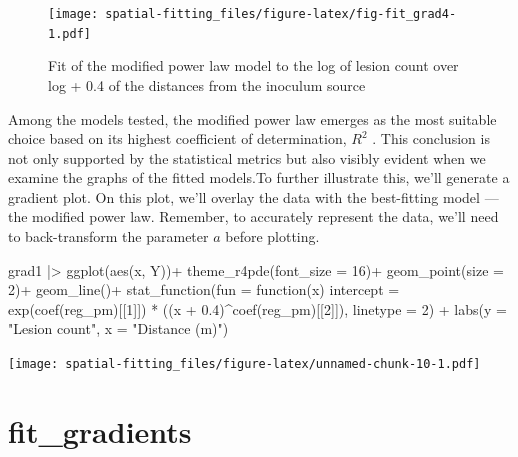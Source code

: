 \documentclass[
  letterpaper,
]{book}
\newenvironment{Shaded}{\begin{snugshade}}{\end{snugshade}}
\newcommand{\AttributeTok}[1]{\textcolor[rgb]{0.40,0.45,0.13}{#1}}
\newcommand{\ControlFlowTok}[1]{\textcolor[rgb]{0.00,0.23,0.31}{#1}}
\newcommand{\DecValTok}[1]{\textcolor[rgb]{0.68,0.00,0.00}{#1}}
\newcommand{\FloatTok}[1]{\textcolor[rgb]{0.68,0.00,0.00}{#1}}
\newcommand{\FunctionTok}[1]{\textcolor[rgb]{0.28,0.35,0.67}{#1}}
\newcommand{\NormalTok}[1]{\textcolor[rgb]{0.00,0.23,0.31}{#1}}
\newcommand{\SpecialCharTok}[1]{\textcolor[rgb]{0.37,0.37,0.37}{#1}}
\newcommand{\StringTok}[1]{\textcolor[rgb]{0.13,0.47,0.30}{#1}}
\begin{document}
\begin{figure}

{\centering \texttt{[image: spatial-fitting\_files/figure-latex/fig-fit\_grad4-1.pdf]}

}

\caption{\label{fig-fit_grad4}Fit of the modified power law model to the
log of lesion count over log + 0.4 of the distances from the inoculum
source}

\end{figure}

Among the models tested, the modified power law emerges as the most
suitable choice based on its highest coefficient of determination,
\(R^2\) . This conclusion is not only supported by the statistical
metrics but also visibly evident when we examine the graphs of the
fitted models.To further illustrate this, we'll generate a gradient
plot. On this plot, we'll overlay the data with the best-fitting model
--- the modified power law. Remember, to accurately represent the data,
we'll need to back-transform the parameter \(a\) before plotting.

\begin{Shaded}
\begin{Highlighting}[]
\NormalTok{grad1 }\SpecialCharTok{|\textgreater{}} 
  \FunctionTok{ggplot}\NormalTok{(}\FunctionTok{aes}\NormalTok{(x, Y))}\SpecialCharTok{+}
  \FunctionTok{theme\_r4pde}\NormalTok{(}\AttributeTok{font\_size =} \DecValTok{16}\NormalTok{)}\SpecialCharTok{+}
  \FunctionTok{geom\_point}\NormalTok{(}\AttributeTok{size =} \DecValTok{2}\NormalTok{)}\SpecialCharTok{+}
  \FunctionTok{geom\_line}\NormalTok{()}\SpecialCharTok{+}
  \FunctionTok{stat\_function}\NormalTok{(}\AttributeTok{fun =} \ControlFlowTok{function}\NormalTok{(x) }\AttributeTok{intercept =} \FunctionTok{exp}\NormalTok{(}\FunctionTok{coef}\NormalTok{(reg\_pm)[[}\DecValTok{1}\NormalTok{]]) }\SpecialCharTok{*}\NormalTok{ ((x }\SpecialCharTok{+} \FloatTok{0.4}\NormalTok{)}\SpecialCharTok{\^{}}\FunctionTok{coef}\NormalTok{(reg\_pm)[[}\DecValTok{2}\NormalTok{]]), }\AttributeTok{linetype =} \DecValTok{2}\NormalTok{) }\SpecialCharTok{+}
  \FunctionTok{labs}\NormalTok{(}\AttributeTok{y =} \StringTok{"Lesion count"}\NormalTok{,}
       \AttributeTok{x =} \StringTok{"Distance (m)"}\NormalTok{)}
\end{Highlighting}
\end{Shaded}

\texttt{[image: spatial-fitting\_files/figure-latex/unnamed-chunk-10-1.pdf]}

\hypertarget{fit_gradients}{%
\section{fit\_gradients}\label{fit_gradients}}
\end{document}
